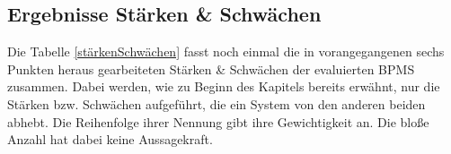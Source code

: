 
\subsection{Ergebnisse Stärken \& Schwächen}
\label{schlussbetrachtungErgebnisse}
Die Tabelle \ref{stärkenSchwächen} fasst noch einmal die in vorangegangenen sechs Punkten heraus gearbeiteten Stärken \& Schwächen der evaluierten \ac{BPMS} zusammen. Dabei werden, wie zu Beginn des Kapitels bereits erwähnt, nur die Stärken bzw. Schwächen aufgeführt, die ein System von den anderen beiden abhebt. Die Reihenfolge ihrer Nennung gibt ihre Gewichtigkeit an. Die bloße Anzahl hat dabei keine Aussagekraft. 



